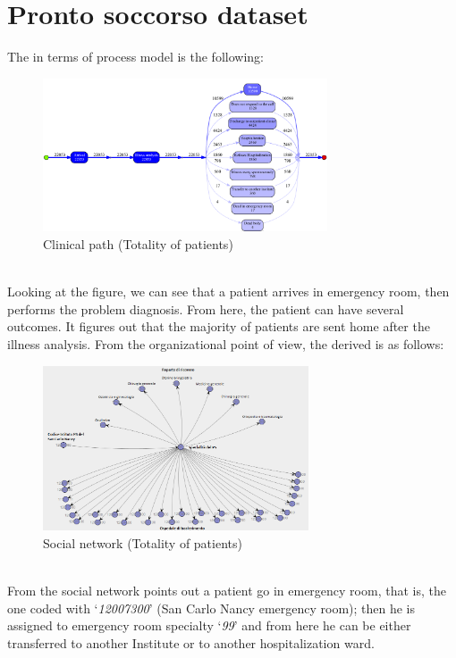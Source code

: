 \section{Pronto soccorso dataset}\label{analysis:2}
The  in terms of process model is the following:
\begin{figure} [htbp]
\includegraphics[width=0.75\textwidth, keepaspectratio]{ProntoSoccorsoInductiveVisualMiner}
\caption{Clinical path (Totality of patients)}
\end{figure}\\
Looking at the figure, we can see that a patient arrives in emergency room, then performs the problem diagnosis. From here, the patient can have several outcomes. It figures out that the majority of patients are sent home after the illness analysis. From the organizational point of view, the  derived is as follows:
\begin{figure} [htbp]
\includegraphics[width=0.7\textwidth, keepaspectratio]{ProntoSoccorsoSocialNetwork}
\caption{Social network (Totality of patients)}
\end{figure}\\
From the social network points out a patient go in emergency room, that is, the one coded with `\textit{12007300}' (San Carlo Nancy emergency room); then he is assigned to emergency room specialty `\textit{99}' and from here he can be either transferred to another Institute or to another hospitalization ward.

